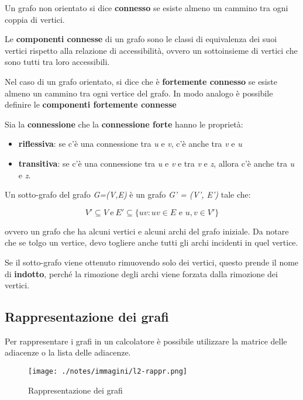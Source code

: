 Un grafo non orientato si dice \textbf{connesso} se esiste almeno un
cammino tra ogni coppia di vertici.

Le \textbf{componenti connesse} di un grafo sono le classi di
equivalenza dei suoi vertici rispetto alla relazione di accessibilità,
ovvero un sottoinsieme di vertici che sono tutti tra loro accessibili.

Nel caso di un grafo orientato, si dice che è \textbf{fortemente
connesso} se esiste almeno un cammino tra ogni vertice del grafo. In
modo analogo è possibile definire le \textbf{componenti fortemente
connesse}

Sia la \textbf{connessione} che la \textbf{connessione forte} hanno le
proprietà:

\begin{itemize}
\item
  \textbf{riflessiva}: se c'è una connessione tra \emph{u} e \emph{v},
  c'è anche tra \emph{v} e \emph{u}
\item
  \textbf{transitiva}: se c'è una connessione tra \emph{u} e \emph{v} e
  tra \emph{v} e \emph{z}, allora c'è anche tra \emph{u} e \emph{z}.
\end{itemize}

Un sotto-grafo del grafo \emph{G=(V,E)} è un grafo \emph{G' = (V', E')}
tale che:

$$
V' \subseteq V \: \text{e} \: E' \subseteq \{ uv : uv \in E \text{ e } u,v \in V' \}
$$

ovvero un grafo che ha alcuni vertici e alcuni archi del grafo iniziale.
Da notare che se tolgo un vertice, devo togliere anche tutti gli archi
incidenti in quel vertice.

Se il sotto-grafo viene ottenuto rimuovendo solo dei vertici, questo
prende il nome di \textbf{indotto}, perché la rimozione degli archi
viene forzata dalla rimozione dei vertici.

\subsection{Rappresentazione dei
grafi}\label{rappresentazione-dei-grafi}

Per rappresentare i grafi in un calcolatore è possibile utilizzare la
matrice delle adiacenze o la lista delle adiacenze.

\begin{figure}[htbp]
\centering
\texttt{[image: ./notes/immagini/l2-rappr.png]}
\caption{Rappresentazione dei grafi}
\end{figure}

